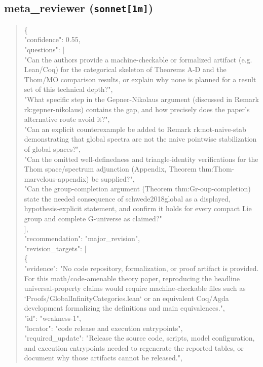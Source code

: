 \documentclass[11pt]{article}
\begin{document}
\subsection*{meta\_reviewer (\texttt{sonnet[1m]})}
\begin{quote}\small\ttfamily\raggedright
\{\\
  "confidence": 0.55,\\
  "questions": [\\
    "Can the authors provide a machine-checkable or formalized artifact (e.g. Lean/Coq) for the categorical skeleton of Theorems A-D and the Thom/MO comparison results, or explain why none is planned for a result set of this technical depth?",\\
    "What specific step in the Gepner-Nikolaus argument (discussed in Remark rk:gepner-nikolaus) contains the gap, and how precisely does the paper's alternative route avoid it?",\\
    "Can an explicit counterexample be added to Remark rk:not-naive-stab demonstrating that global spectra are not the naive pointwise stabilization of global spaces?",\\
    "Can the omitted well-definedness and triangle-identity verifications for the Thom space/spectrum adjunction (Appendix, Theorem thm:Thom-marvelous-appendix) be supplied?",\\
    "Can the group-completion argument (Theorem thm:Gr-oup-completion) state the needed consequence of schwede2018global as a displayed, hypothesis-explicit statement, and confirm it holds for every compact Lie group and complete G-universe as claimed?"\\
  ],\\
  "recommendation": "major\_revision",\\
  "revision\_targets": [\\
    \{\\
      "evidence": "No code repository, formalization, or proof artifact is provided. For this math/code-amenable theory paper, reproducing the headline universal-property claims would require machine-checkable files such as `Proofs/GlobalInfinityCategories.lean` or an equivalent Coq/Agda development formalizing the definitions and main equivalences.",\\
      "id": "weakness-1",\\
      "locator": "code release and execution entrypoints",\\
      "required\_update": "Release the source code, scripts, model configuration, and execution entrypoints needed to regenerate the reported tables, or document why those artifacts cannot be released.",\\

\end{quote}
\end{document}
